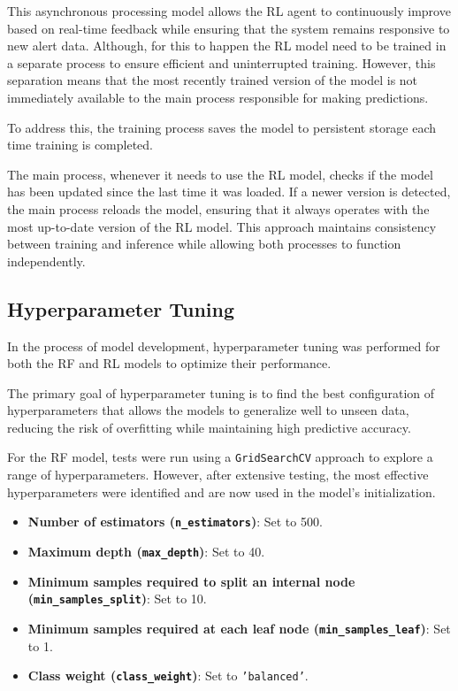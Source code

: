This asynchronous processing model allows the RL agent to continuously improve based on real-time feedback while ensuring that the system remains responsive to new alert data.
Although, for this to happen the RL model need to be trained in a separate process to ensure efficient and uninterrupted training. 
However, this separation means that the most recently trained version of the model is not immediately available to the main process responsible for making predictions. 

To address this, the training process saves the model to persistent storage each time training is completed. 

The main process, whenever it needs to use the RL model, checks if the model has been updated since the last time it was loaded. 
If a newer version is detected, the main process reloads the model, ensuring that it always operates with the most up-to-date version of the RL model.
This approach maintains consistency between training and inference while allowing both processes to function independently.

\subsection{Hyperparameter Tuning}

In the process of model development, hyperparameter tuning was performed for both the \gls{RF} and \gls{RL} models to optimize their performance. 

The primary goal of hyperparameter tuning is to find the best configuration of hyperparameters that allows the models to generalize well to unseen data, reducing the risk of overfitting while maintaining high predictive accuracy.

For the \gls{RF} model, tests were run using a \texttt{GridSearchCV} approach to explore a range of hyperparameters. 
However, after extensive testing, the most effective hyperparameters were identified and are now used in the model's initialization. 

\begin{itemize}
    \item \textbf{Number of estimators (\texttt{n\_estimators})}: Set to 500.
    \item \textbf{Maximum depth (\texttt{max\_depth})}: Set to 40.
    \item \textbf{Minimum samples required to split an internal node (\texttt{min\_samples\_split})}: Set to 10.
    \item \textbf{Minimum samples required at each leaf node (\texttt{min\_samples\_leaf})}: Set to 1.
    \item \textbf{Class weight (\texttt{class\_weight})}: Set to \texttt{'balanced'}.
\end{itemize}

